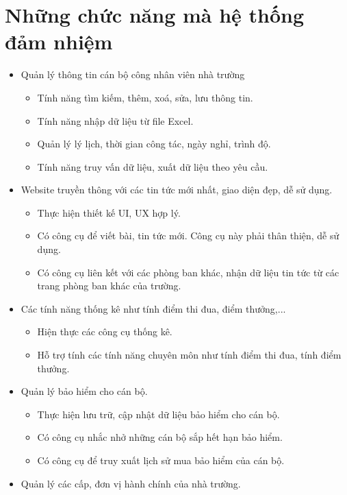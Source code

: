 \section{Những chức năng mà hệ thống đảm nhiệm}
\begin{itemize}
    \item Quản lý thông tin cán bộ công nhân viên nhà trường
    \begin{itemize}
        \item Tính năng tìm kiếm, thêm, xoá, sửa, lưu thông tin.
        \item Tính năng nhập dữ liệu từ file Excel.
        \item Quản lý lý lịch, thời gian công tác, ngày nghỉ, trình độ.
        \item Tính năng truy vấn dữ liệu, xuất dữ liệu theo yêu cầu. 
    \end{itemize}
    \item Website truyền thông với các tin tức mới nhất, giao diện đẹp, dễ sử dụng.
    \begin{itemize}
        \item Thực hiện thiết kế UI, UX hợp lý.
        \item Có công cụ để viết bài, tin tức mới. Công cụ này phải thân thiện, dễ sử dụng.
        \item Có công cụ liên kết với các phòng ban khác, nhận dữ liệu tin tức từ các trang phòng ban khác của trường.
    \end{itemize}
    \item Các tính năng thống kê như tính điểm thi đua, điểm thưởng,...
    \begin{itemize}
        \item Hiện thực các công cụ thống kê.
        \item Hỗ trợ tính các tính năng chuyên môn như tính điểm thi đua, tính điểm thưởng.
    \end{itemize}
    \item Quản lý bảo hiểm cho cán bộ.
    \begin{itemize}
        \item Thực hiện lưu trữ, cập nhật dữ liệu bảo hiểm cho cán bộ.
        \item Có công cụ nhắc nhở những cán bộ sắp hết hạn bảo hiểm.
        \item Có công cụ để truy xuất lịch sử mua bảo hiểm của cán bộ.
    \end{itemize}
    \item Quản lý các cấp, đơn vị hành chính của nhà trường.

\end{itemize}
